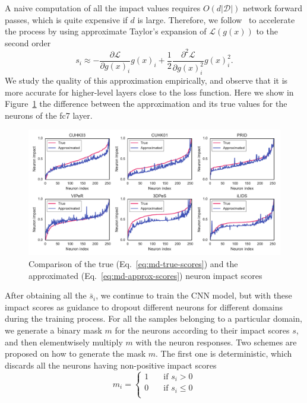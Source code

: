 A naive computation of all the impact values requires $O(d|\mathcal{D}|)$ network forward passes, which is quite expensive if $d$ is large. Therefore, we follow~\cite{simonyan2013deep} to accelerate the process by using approximate Taylor's expansion of $\mathcal{L}(g(x))$ to the second order
\begin{equation} \label{eq:md-approx-scores}
   s_i\approx -\frac{\partial \mathcal{L}}{\partial g(x)_i} g(x)_i + \frac{1}{2} \frac{\partial^2 \mathcal{L}}{\partial g(x)_i^2} g(x)_i^2.
\end{equation}
We study the quality of this approximation empirically, and observe that it is more accurate for higher-level layers close to the loss function. Here we show in Figure~\ref{fig:md-impact-true-vs-approx} the difference between the approximation and its true values for the neurons of the fc7 layer.

\begin{figure}[t]
\begin{center}
\includegraphics[width=1.0\linewidth]{figures/multi_domain/impact_true_vs_approx.pdf}
\end{center}
\caption{Comparison of the true (Eq.~\eqref{eq:md-true-scores}) and the approximated (Eq.~\eqref{eq:md-approx-scores}) neuron impact scores}
\label{fig:md-impact-true-vs-approx}
\end{figure}

After obtaining all the $\bar{s}_i$, we continue to train the CNN model, but with these impact scores as guidance to dropout different neurons for different domains during the training process. For all the samples belonging to a particular domain, we generate a binary mask $m$ for the neurons according to their impact scores $s$, and then elementwisely multiply $m$ with the neuron responses. Two schemes are proposed on how to generate the mask $m$. The first one is deterministic, which discards all the neurons having non-positive impact scores
\begin{equation}
   m_i=\begin{cases}
      1 & \quad \text{if } s_i > 0\\
      0 & \quad \text{if } s_i \le 0\\
   \end{cases}
\end{equation}

